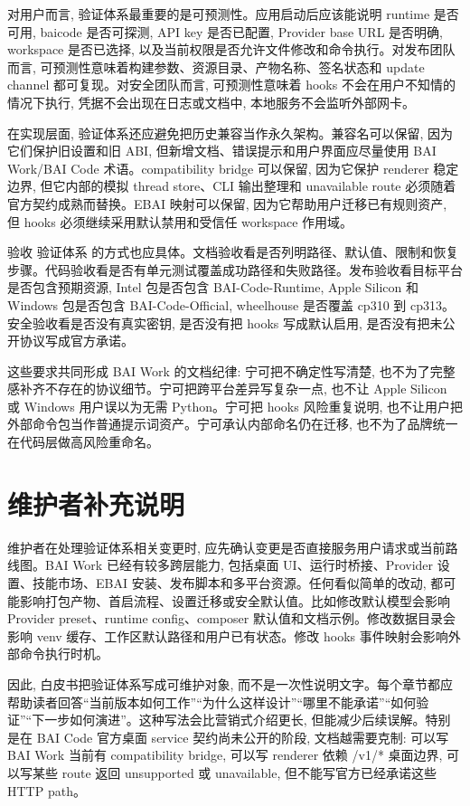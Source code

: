 对用户而言, 验证体系最重要的是可预测性。应用启动后应该能说明 runtime 是否可用, baicode 是否可探测, API key 是否已配置, Provider base URL 是否明确, workspace 是否已选择, 以及当前权限是否允许文件修改和命令执行。对发布团队而言, 可预测性意味着构建参数、资源目录、产物名称、签名状态和 update channel 都可复现。对安全团队而言, 可预测性意味着 hooks 不会在用户不知情的情况下执行, 凭据不会出现在日志或文档中, 本地服务不会监听外部网卡。

在实现层面, 验证体系还应避免把历史兼容当作永久架构。兼容名可以保留, 因为它们保护旧设置和旧 ABI, 但新增文档、错误提示和用户界面应尽量使用 BAI Work/BAI Code 术语。compatibility bridge 可以保留, 因为它保护 renderer 稳定边界, 但它内部的模拟 thread store、CLI 输出整理和 unavailable route 必须随着官方契约成熟而替换。EBAI 映射可以保留, 因为它帮助用户迁移已有规则资产, 但 hooks 必须继续采用默认禁用和受信任 workspace 作用域。

验收 验证体系 的方式也应具体。文档验收看是否列明路径、默认值、限制和恢复步骤。代码验收看是否有单元测试覆盖成功路径和失败路径。发布验收看目标平台是否包含预期资源, Intel 包是否包含 BAI-Code-Runtime, Apple Silicon 和 Windows 包是否包含 BAI-Code-Official, wheelhouse 是否覆盖 cp310 到 cp313。安全验收看是否没有真实密钥, 是否没有把 hooks 写成默认启用, 是否没有把未公开协议写成官方承诺。

这些要求共同形成 BAI Work 的文档纪律: 宁可把不确定性写清楚, 也不为了完整感补齐不存在的协议细节。宁可把跨平台差异写复杂一点, 也不让 Apple Silicon 或 Windows 用户误以为无需 Python。宁可把 hooks 风险重复说明, 也不让用户把外部命令包当作普通提示词资产。宁可承认内部命名仍在迁移, 也不为了品牌统一在代码层做高风险重命名。

\section{维护者补充说明}

维护者在处理验证体系相关变更时, 应先确认变更是否直接服务用户请求或当前路线图。BAI Work 已经有较多跨层能力, 包括桌面 UI、运行时桥接、Provider 设置、技能市场、EBAI 安装、发布脚本和多平台资源。任何看似简单的改动, 都可能影响打包产物、首启流程、设置迁移或安全默认值。比如修改默认模型会影响 Provider preset、runtime config、composer 默认值和文档示例。修改数据目录会影响 venv 缓存、工作区默认路径和用户已有状态。修改 hooks 事件映射会影响外部命令执行时机。

因此, 白皮书把验证体系写成可维护对象, 而不是一次性说明文字。每个章节都应帮助读者回答“当前版本如何工作”“为什么这样设计”“哪里不能承诺”“如何验证”“下一步如何演进”。这种写法会比营销式介绍更长, 但能减少后续误解。特别是在 BAI Code 官方桌面 service 契约尚未公开的阶段, 文档越需要克制: 可以写 BAI Work 当前有 compatibility bridge, 可以写 renderer 依赖 /v1/* 桌面边界, 可以写某些 route 返回 unsupported 或 unavailable, 但不能写官方已经承诺这些 HTTP path。

